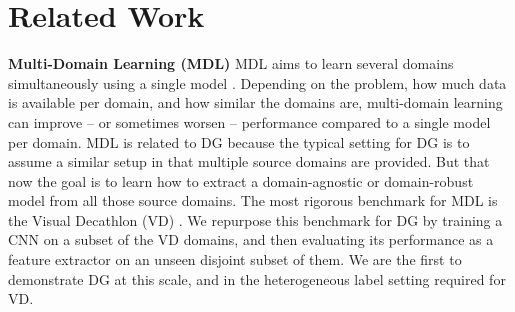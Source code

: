 \documentclass[10pt,twocolumn,letterpaper]{article}
\newcommand{\keypoint}[1]{\vspace{0.1cm}\noindent\textbf{#1}\quad}
\begin{document}
\section{Related Work}

\keypoint{Multi-Domain Learning (MDL)} MDL aims to learn several domains simultaneously using a single model \cite{Bilen17,Rebuffi17,Rebuffi18,yang2015mdlmtl}. Depending on the problem, how much data is available per domain, and how similar the domains are, multi-domain learning can improve \cite{yang2015mdlmtl} -- or sometimes worsen \cite{Bilen17,Rebuffi17,Rebuffi18} -- performance compared to a single model per domain. MDL is related to DG because the typical setting for DG is to assume a similar setup in that multiple source domains are provided. But that now the goal is to learn how to extract a domain-agnostic or domain-robust model from all those source domains. 
The most rigorous benchmark for MDL is the Visual Decathlon (VD) \cite{Rebuffi17}. We repurpose this benchmark for DG by training a CNN on a subset of the VD domains, and then evaluating its performance as a feature extractor on an unseen disjoint subset of them. We are the first to demonstrate DG at this scale, and in the heterogeneous label setting required for VD.
\end{document}
